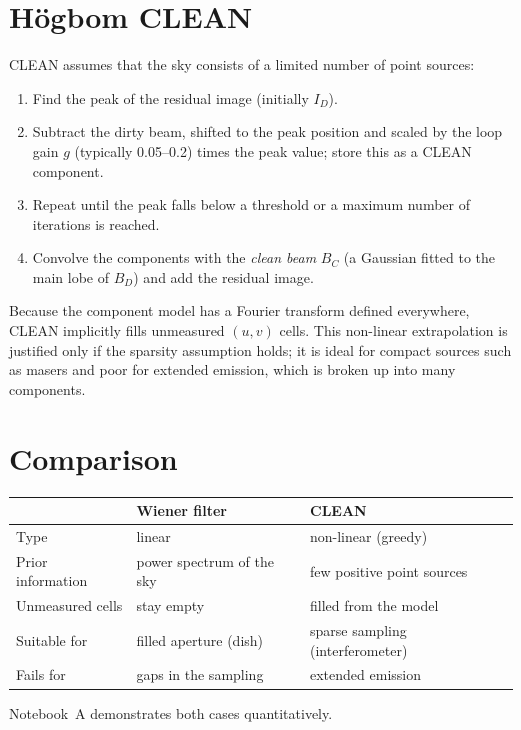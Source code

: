 \section{Högbom CLEAN}

CLEAN \cite{hogbom1974} assumes that the sky consists of a limited
number of point sources:
\begin{enumerate}
  \item Find the peak of the residual image (initially $I_D$).
  \item Subtract the dirty beam, shifted to the peak position and
        scaled by the loop gain $g$ (typically 0.05--0.2) times the
        peak value; store this as a CLEAN component.
  \item Repeat until the peak falls below a threshold or a maximum
        number of iterations is reached.
  \item Convolve the components with the \emph{clean beam} $B_C$ (a
        Gaussian fitted to the main lobe of $B_D$) and add the residual
        image.
\end{enumerate}
Because the component model has a Fourier transform defined
everywhere, CLEAN implicitly fills unmeasured $(u,v)$ cells. This
non-linear extrapolation is justified only if the sparsity assumption
holds; it is ideal for compact sources such as masers and poor for
extended emission, which is broken up into many components.

\section{Comparison}

\begin{center}
\begin{tabular}{@{}>{\raggedright\arraybackslash}p{3.4cm}
                >{\raggedright\arraybackslash}p{5.0cm}
                >{\raggedright\arraybackslash}p{5.0cm}@{}}
\toprule
 & Wiener filter & CLEAN \\
\midrule
Type & linear & non-linear (greedy) \\
Prior information & power spectrum of the sky & few positive point sources \\
Unmeasured cells & stay empty & filled from the model \\
Suitable for & filled aperture (dish) & sparse sampling (interferometer) \\
Fails for & gaps in the sampling & extended emission \\
\bottomrule
\end{tabular}
\end{center}
Notebook~A demonstrates both cases quantitatively.

